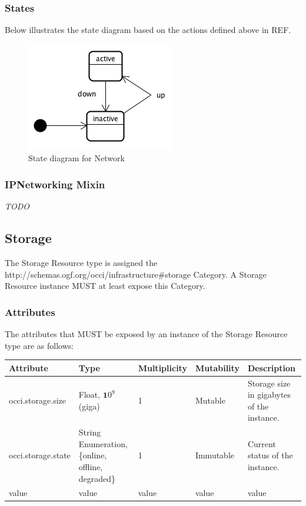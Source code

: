\documentclass[10pt,a4paper]{article}
\begin{document}
\subsubsection{States}
Below illustrates the state diagram based on the actions defined above in REF.

\begin{figure}[!h]
	\centering
	\includegraphics[scale=0.4]{figs/network-state.png}
	\caption{State diagram for Network}
	\label{fig:network_state}
\end{figure}

\subsubsection{IPNetworking Mixin}

\emph{TODO}

\subsection{Storage}
The Storage Resource type is assigned the http://schemas.ogf.org/occi/infrastructure\#storage Category. A Storage Resource instance MUST at least expose this Category.

\subsubsection{Attributes}
The attributes that MUST be exposed by an instance of the Storage Resource type are as follows:

\begin{tabular}{lllll}
Attribute&Type&Multiplicity&Mutability&Description\\
\hline
occi.storage.size & Float, ${\mathbf 10}^9$ (giga) & 1 & Mutable & Storage size in gigabytes of the instance.\\
occi.storage.state & String Enumeration, \{online, offline, degraded\} & 1 & Immutable & Current status of the instance.\\
value & value & value & value & value\\
\end{tabular}
\end{document}
